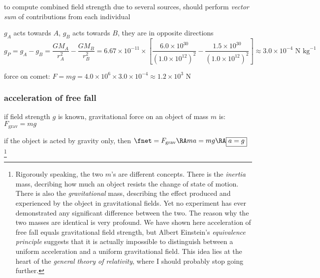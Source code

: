 to compute combined field strength due to several sources, should perform \emph{vector sum} of contributions from each individual


\begin{center}
\end{center}

\sol $g_A$ acts towards $A$, $g_B$ acts towards $B$, they are in opposite directions
\begin{equation*}
	g_P = g_A - g_B = \frac{GM_A}{r_A^2} - \frac{GM_B}{r_B^2} = 6.67\times10^{-11} \times\left[ \frac{6.0\times10^{30}}{(1.0\times10^{12})^2} - \frac{1.5\times10^{30}}{(1.0\times10^{12})^2}\right] \approx 3.0\times10^{-4} \text{ N kg}^{-1}
\end{equation*}

force on comet: $F=mg = 4.0\times10^6 \times 3.0\times10^{-4} \approx 1.2\times10^3 \text{ N}$ \eoe

\subsubsection{acceleration of free fall}

if field strength $g$ is known, gravitational force on an object of mass $m$ is: $F_\text{grav} = mg$

if the object is acted by gravity only, then $\fnet = F_\text{grav} \RA ma = mg \RA \boxed{a=g}$
\footnote{Rigorously speaking, the two $m$'s are different concepts. There is the \emph{inertia} mass, decribing how much an object resists the change of state of motion. There is also the \emph{gravitational} mass, describing the effect produced and experienced by the object in gravitational fields. Yet no experiment has ever demonstrated any significant difference between the two. The reason why the two masses are identical is very profound. We have shown here acceleration of free fall equals gravitational field strength, but Albert Einstein's \emph{equivalence principle} suggests that it is actually impossible to distinguish between a uniform acceleration and a uniform gravitational field. This idea lies at the heart of the \emph{general theory of relativity}, where I should probably stop going further.}

